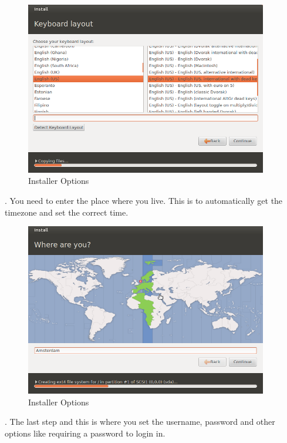 \begin{figure}[!ht]	
	\begin{center}
	\includegraphics[width=300pt]{./images/installation/installer-keyboard.png}
	\caption{Installer Options}	
	\label{fig:installer-keyboard}	
	\end{center}
\end{figure}
\newpage
\par {}. You need to enter the place where you live. This is to automatically get the timezone and set the correct time. \\

\begin{figure}[!h]	
	\begin{center}
	\includegraphics[width=300pt]{./images/installation/installer-timezone.png}
	\caption{Installer Options}	
	\label{fig:installer-keyboard}	
	\end{center}
\end{figure}

\par {}. The last step and this is where you set the username, password and other options like requiring a password to login in. \\

